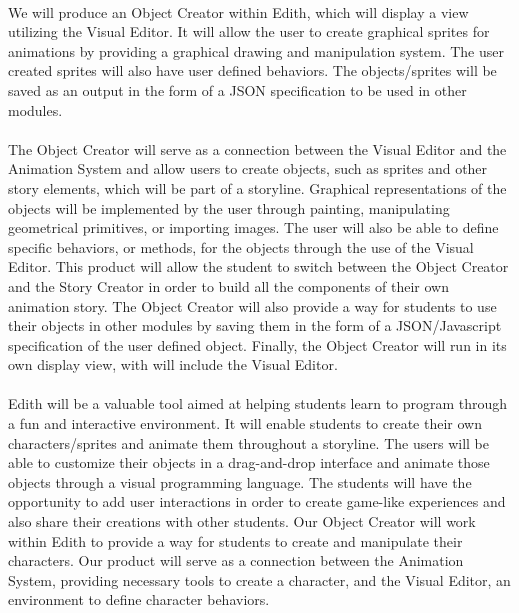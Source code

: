 \documentclass[12pt]{report}
\begin{document}
\paragraph{\parindent 20pt} We will produce an Object Creator within Edith, which will display a view utilizing the Visual Editor. It will allow the user to create graphical sprites for animations by providing a graphical drawing and manipulation system. The user created sprites will also have user defined behaviors. The objects/sprites will be saved as an output in the form of a JSON specification to be used in other modules.
\paragraph{\parindent 20pt} The Object Creator will serve as a connection between the Visual Editor and the Animation System and allow users to create objects, such as sprites and other story elements, which will be part of a storyline. Graphical representations of the objects will be implemented by the user through painting, manipulating geometrical primitives, or importing images. The user will also be able to define specific behaviors, or methods, for the objects through the use of the Visual Editor. This product will allow the student to switch between the Object Creator and the Story Creator in order to build all the components of their own animation story. The Object Creator will also provide a way for students to use their objects in other modules by saving them in the form of a JSON/Javascript specification of the user defined object. Finally, the Object Creator will run in its own display view, with will include the Visual Editor. 
\paragraph{\parindent 20pt} Edith will be a valuable tool aimed at helping students learn to program through a fun and interactive environment. It will enable students to create their own characters/sprites and animate them throughout a storyline. The users will be able to customize their objects in a drag-and-drop interface and animate those objects through a visual programming language. The students will have the opportunity to add user interactions in order to create game-like experiences and also share their creations with other students. Our Object Creator will work within Edith to provide a way for students to create and manipulate their characters. Our product will serve as a connection between the Animation System, providing necessary tools to create a character, and the Visual Editor, an environment to define character behaviors.
\end{document}
